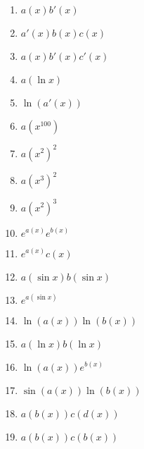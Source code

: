 \documentclass{article}
\begin{document}
\begin{multicols}{3}
\begin{enumerate}
    \item $a(x)b'(x)$
    \item $a'(x)b(x)c(x)$
    \item $a(x)b'(x)c'(x)$
    \item $a(\ln x)$
    \item $\ln(a'(x))$
    \item $a(x^{100})$
    \item $a(x^2)^2$
    \item $a(x^3)^2$
    \item $a(x^2)^3$
    \item $e^{a(x)}e^{b(x)}$
    \item $e^{a(x)}c(x)$
    \item $a(\sin x)b(\sin x)$
    \item $e^{a(\sin x)}$
    \item $\ln(a(x))\ln(b(x))$
    \item $a(\ln x)b(\ln x)$
    \item $\ln(a(x))e^{b(x)}$
    \item $\sin(a(x))\ln(b(x))$
    \item $a(b(x))c(d(x))$
    \item $a(b(x))c(b(x))$
\end{enumerate} 
\end{multicols}
\end{document}
